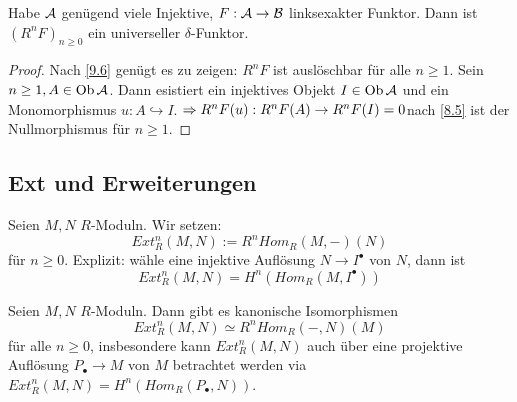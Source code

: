 \begin{fo}\label{9.7}
	Habe $\mathcal{A} $ genügend viele Injektive, $F: \mathcal{A} \to \mathcal{B} $ linksexakter Funktor. Dann ist $(R^{n}F)_{n \geq 0}$ ein universeller $\delta$-Funktor. 
\end{fo}
\begin{proof}
	Nach \ref{9.6} genügt es zu zeigen: $R^{n}F$ ist auslöschbar für alle $ n \geq 1$. Sein $n \geq 1, A \in \text{Ob}\,\mathcal{A} $. Dann esistiert ein injektives Objekt $I \in \text{Ob}\,\mathcal{A}$ und ein Monomorphismus $u: A \hookrightarrow I $. 
	$\Rightarrow R^{n}F(u): R^{n}F(A) \to R^{n}F(I) = 0 $nach \ref{8.5} ist der Nullmorphismus für $n \geq 1$.
\end{proof}
\newpage
\subsection{Ext und Erweiterungen}
\begin{df}
	Seien $M,N$ $R$-Moduln. Wir setzen: $$Ext^{n}_R(M,N) := R^{n}Hom_R(M,-)(N) $$ für $ n \geq 0$. Explizit: wähle eine injektive Auflösung $N \to I^{\bullet} $ von $N$, dann ist $$Ext^{n}_R(M,N)=H^{n}(Hom_R(M,I^{\bullet}))$$
\end{df}
\begin{sa}\label{10.2}
	Seien $M,N$ $R$-Moduln. Dann gibt es kanonische Isomorphismen $$Ext^{n}_R(M,N) \simeq R^{n}Hom_R(-,N)(M)$$ für alle $ n \geq 0$, insbesondere kann $Ext^{n}_R(M,N)$ auch über eine projektive Auflösung $P_{\bullet} \to M $ von $M$ betrachtet werden via $Ext^{n}_R(M,N)=H^{n}(Hom_R(P_{\bullet},N))$.
\end{sa}
